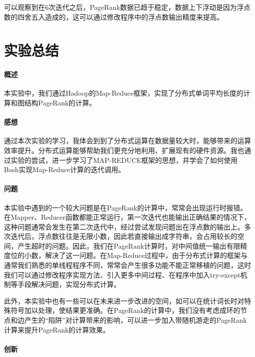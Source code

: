 \documentclass{article}
\begin{document}
可以观察到在6次迭代之后，PageRank数据已趋于稳定，数据上下浮动是因为浮点数的四舍五入造成的，这可以通过修改程序中的浮点数输出精度来提高。


\section{实验总结}
\paragraph{概述}
本实验中，我们通过Hadoop的Map-Reduce框架，实现了分布式单词平均长度的计算和图结构PageRank的计算。

\paragraph{感想}
通过本次实验的学习，我体会到到了分布式运算在数据量较大时，能够带来的运算效率提升。分布式运算能够帮助我们更充分地利用、扩展现有的硬件资源。我也通过实验的尝试，进一步学习了MAP-REDUCE框架的思想，并学会了如何使用Bash实现Map-Reduce计算的迭代调用。

\paragraph{问题}
本实验中遇到的一个较大问题是在PageRank的计算中，常常会出现运行时报错。在Mapper、Reducer函数都能正常运行，第一次迭代也能输出正确结果的情况下，这种问题通常会发生在第二次迭代中，经过尝试发现问题出在浮点数的输出上。多次迭代后，浮点数往往是无限小数，因此若直接输出成字符串，会占用较长的空间，产生超时的问题。因此，我们在PageRank计算时，对中间值统一输出有限精度位的小数，解决了这一问题。在Map-Reduce过程中，由于分布式计算的框架与通常我们熟悉的单线程程序不同，常常会产生很多功能不能正常移植的问题，这时我们可以通过修改程序实现方法、引入更多中间过程、在程序中加入try-except机制等手段解决问题，实现分布式计算。

此外，本实验中也有一些可以在未来进一步改进的空间，如可以在统计词长时对特殊符号加以处理，使结果更准确。在PageRank的计算中，我们没有考虑成环的节点和边产生的“陷阱”对计算带来的影响，可以进一步加入带随机游走的PageRank计算来提升PageRank的计算效果。

\paragraph{创新}
\end{document}

